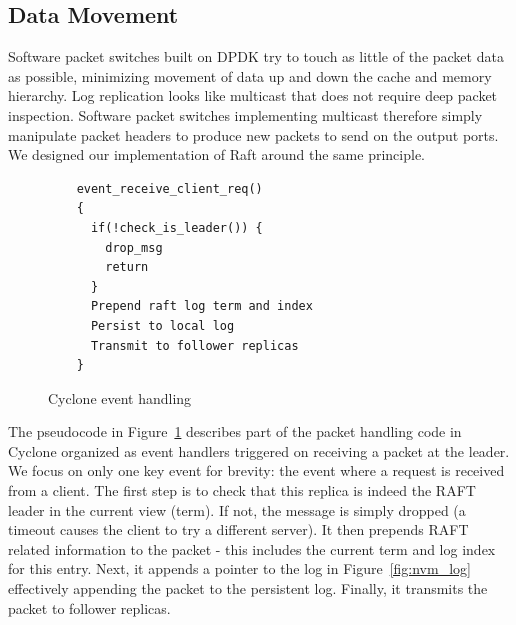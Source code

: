 \documentclass[pageno]{jpaper}
\begin{document}
\subsection{Data Movement}
\label{sec:dm}
Software packet switches built on DPDK try to touch as little of the packet data
as possible, minimizing movement of data up and down the cache and memory
hierarchy. Log replication looks like multicast that does not require deep
packet inspection. Software packet switches implementing multicast therefore
simply manipulate packet headers to produce new packets to send on the output
ports. We designed our implementation of Raft around the same principle.

\begin{figure}
\begin{verbatim}
    event_receive_client_req()
    {
      if(!check_is_leader()) {
        drop_msg
        return
      }
      Prepend raft log term and index
      Persist to local log
      Transmit to follower replicas
    }
\end{verbatim}
\caption{Cyclone event handling}
\label{fig:control_plane}
\end{figure}


The pseudocode in Figure~\ref{fig:control_plane} describes part of the packet
handling code in Cyclone organized as event handlers triggered on receiving a
packet at the leader. We focus on only one key event for brevity: the event
where a request is received from a client. The first step is to check that this
replica is indeed the RAFT leader in the current view (term). If not, the
message is simply dropped (a timeout causes the client to try a different
server). It then prepends RAFT related information to the packet - this includes
the current term and log index for this entry. Next, it appends a pointer to the
log in Figure~\ref{fig:nvm_log} effectively appending the packet to the
persistent log. Finally, it transmits the packet to follower replicas.
\end{document}
